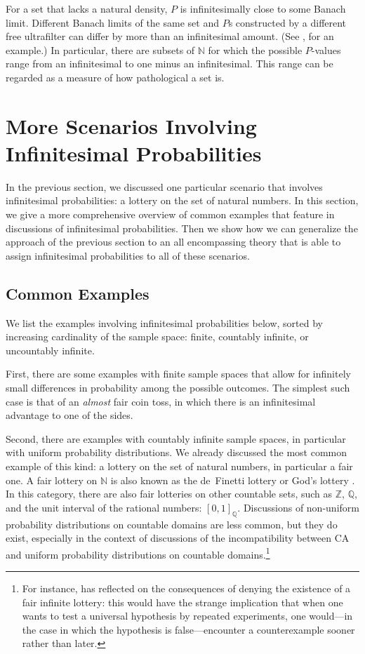 For a set that lacks a natural density, $P$ is infinitesimally close to some Banach limit. Different Banach limits of the same set and $P$s constructed by a different free ultrafilter can differ by more than an infinitesimal amount. (See \citealp{KerkvlietMeester:2016}, for an example.) In particular, there are subsets of $\mathbb{N}$ for which the possible $P$-values range from an infinitesimal to one minus an infinitesimal. This range can be regarded as a measure of how pathological a set is.


\section{More Scenarios Involving Infinitesimal Probabilities}\label{sec:more}
In the previous section, we discussed one particular scenario that involves infinitesimal probabilities: a lottery on the set of natural numbers. In this section, we give a more comprehensive overview of common examples that feature in discussions of infinitesimal probabilities. Then we show how we can generalize the approach of the previous section to an all encompassing theory that is able to assign infinitesimal probabilities to all of these scenarios.

\subsection{Common Examples}
We list the examples involving infinitesimal probabilities below, sorted by increasing cardinality of the sample space: finite, countably infinite, or uncountably infinite.

First, there are some examples with finite sample spaces that allow for infinitely small differences in probability among the possible outcomes. The simplest such case is that of an \emph{almost} fair coin toss, in which there is an infinitesimal advantage to one of the sides.

Second, there are examples with countably infinite sample spaces, in particular with uniform probability distributions.
We already discussed the most common example of this kind: a lottery on the set of natural numbers, in particular a fair one. A fair lottery on $\mathbb{N}$ is also known as the de~Finetti lottery \citep{Bartha:2004} or God's lottery \citep{McCallArmstrong:1989}.
In this category, there are also fair lotteries on other countable sets, such as $\mathbb{Z}$, $\mathbb{Q}$, and the unit interval of the rational numbers: $[0,1]_\mathbb{Q}$.
Discussions of non-uniform probability distributions on countable domains are less common, but they do exist, especially in the context of discussions of the incompatibility between CA and uniform probability distributions on countable domains.\footnote{For instance, \citet{Kelly:1996} has reflected on the consequences of denying the existence of a fair infinite lottery: this would have the strange implication that when one wants to test a universal hypothesis by repeated experiments, one would---in the case in which the hypothesis is false---encounter a counterexample sooner rather than later.}

